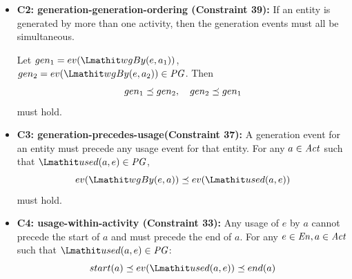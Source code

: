 %
\begin{itemize}
	
	\item\textbf{C2: generation-generation-ordering (Constraint 39):}  If an entity is generated by more than one activity, then the generation events must all be simultaneous.
	
	Let 
	$gen_1 = ev(\wgby(e, a_1))$, $gen_2 = ev(\wgby(e, a_2)) \in \pg$. Then  \[gen_1  \preceq  gen_2, \quad gen_2 \preceq gen_1\] must hold.
	
	\item\textbf{C3: generation-precedes-usage(Constraint 37):} A generation event for an entity must precede any usage event for that entity.
	For any $a \in \mathit{Act}$ such that $\used(a,e) \in \pg$, \[	ev(\wgby(e, a)) \preorder ev(\used(a,e))\] must hold.
	
	
	
%	
	
	\item\textbf{C4: usage-within-activity (Constraint 33):} Any usage of $e$ by $a$ cannot precede the start of $a$ and must precede the end of $a$. For any $e\in \mathit{En}, a \in \mathit{Act}$ such that $\used(a,e) \in \pg$:
	\[start(a) \preorder ev(\used(a,e))   \preorder end(a)\]
	

\end{itemize}
